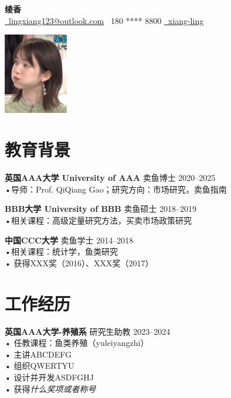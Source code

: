 \documentclass[10pt, letterpaper]{article}
\begin{document}
\begin{minipage}[t]{0.75\textwidth}
\vspace{0pt}
{\textbf{绫香}} \\
\vspace{0.2cm}
\href{mailto:lingxiang123@outlook.com}{\faEnvelope[regular]~lingxiang123@outlook.com} \quad 
\faPhone*~180 **** 8800 \quad
\href{https://linkedin.com/in/your own link}{\faLinkedinIn~xiang-ling}
\end{minipage}%
\hfill %
\begin{minipage}[t]{0.22\textwidth}
\vspace*{-1cm} %
\begin{flushright}
\includegraphics[width=2.8cm]{selfie.png}
\end{flushright}
\end{minipage}

\vspace*{-0.9cm} %


\section{教育背景}

\noindent\textbf{英国AAA大学 University of AAA} \hfill \quad 卖鱼博士 \hfill 2020--2025 \\
\quad •导师：Prof. QiQiang Gao；研究方向：市场研究，卖鱼指南

\noindent\textbf{BBB大学 University of BBB} \hfill 卖鱼硕士 \hfill 2018--2019 \\
\quad •相关课程：高级定量研究方法，买卖市场政策研究


\noindent\textbf{中国CCC大学} \hfill \quad\quad\quad\quad\quad\quad\quad\quad\quad\quad\quad 卖鱼学士 \hfill 2014--2018 \\
\quad •相关课程：统计学，鱼类研究\\
\quad • 获得XXX奖（2016）、XXX奖（2017）

\vspace{-0.2cm}
\section{工作经历}
\noindent\textbf{英国AAA大学-养殖系} \hfill \quad\quad\quad\quad\quad\quad\quad 研究生助教 \hfill 2023--2024 \\
\quad • 任教课程：鱼类养殖（yuleiyangzhi）\\
\quad • 主讲ABCDEFG\\
\quad • 组织QWERTYU\\
\quad • 设计并开发ASDFGHJ\\
\quad • 获得\textit{什么奖项或者称号}
\end{document}
